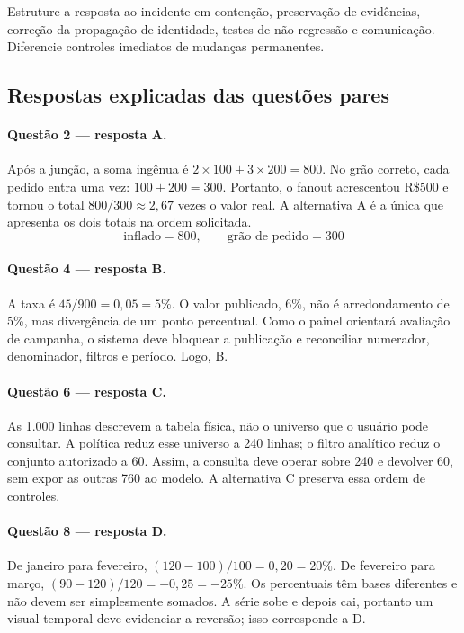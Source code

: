 \FonteDidatica

\Comando Estruture a resposta ao incidente em contenção, preservação de evidências, correção da propagação de identidade, testes de não regressão e comunicação. Diferencie controles imediatos de mudanças permanentes.

\newpage

\subsection{Respostas explicadas das questões pares}

\paragraph{Questão 2 --- resposta A.} Após a junção, a soma ingênua é $2\times100+3\times200=800$. No grão correto, cada pedido entra uma vez: $100+200=300$. Portanto, o fanout acrescentou R\$500 e tornou o total $800/300\approx2{,}67$ vezes o valor real. A alternativa A é a única que apresenta os dois totais na ordem solicitada.
\[\text{inflado}=800,\qquad \text{grão de pedido}=300\]

\paragraph{Questão 4 --- resposta B.} A taxa é $45/900=0{,}05=5\%$. O valor publicado, 6\%, não é arredondamento de 5\%, mas divergência de um ponto percentual. Como o painel orientará avaliação de campanha, o sistema deve bloquear a publicação e reconciliar numerador, denominador, filtros e período. Logo, B.

\paragraph{Questão 6 --- resposta C.} As 1.000 linhas descrevem a tabela física, não o universo que o usuário pode consultar. A política reduz esse universo a 240 linhas; o filtro analítico reduz o conjunto autorizado a 60. Assim, a consulta deve operar sobre 240 e devolver 60, sem expor as outras 760 ao modelo. A alternativa C preserva essa ordem de controles.

\paragraph{Questão 8 --- resposta D.} De janeiro para fevereiro, $(120-100)/100=0{,}20=20\%$. De fevereiro para março, $(90-120)/120=-0{,}25=-25\%$. Os percentuais têm bases diferentes e não devem ser simplesmente somados. A série sobe e depois cai, portanto um visual temporal deve evidenciar a reversão; isso corresponde a D.

